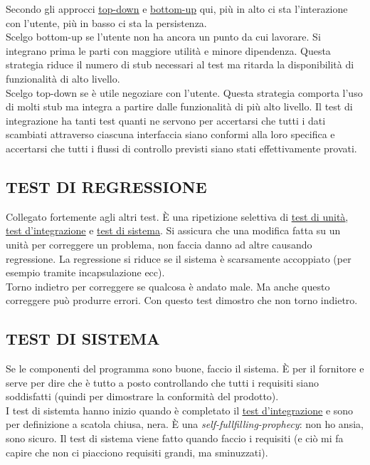 		Secondo gli approcci \underline{\hyperref[topdown]{top-down}} e \underline{\hyperref[bottomup]{bottom-up}} qui, più in alto ci sta l'interazione con l'utente, più in basso ci sta la persistenza. \\
		Scelgo bottom-up se l'utente non ha ancora un punto da cui lavorare. Si integrano prima le parti con maggiore utilità e minore dipendenza. Questa strategia riduce il numero di stub necessari al test ma ritarda la disponibilità di funzionalità di alto livello. \\
		Scelgo top-down se è utile negoziare con l'utente. Questa strategia comporta l’uso di molti stub ma integra a partire dalle funzionalità di più alto livello. %
		Il test di integrazione ha tanti test quanti ne servono per accertarsi che tutti i dati scambiati attraverso ciascuna interfaccia siano conformi alla loro specifica e accertarsi che tutti i flussi di controllo previsti siano stati effettivamente provati.
	
		
		\subsection{TEST DI REGRESSIONE}		\label{testregressione}
		Collegato fortemente agli altri test. È una ripetizione selettiva di \underline{\hyperref[testunita]{test di unità}}, \underline{\hyperref[testintegrazione]{test d'integrazione}} e \underline{\hyperref[testsistema]{test di sistema}}. Si assicura che una modifica fatta su un unità per correggere un problema, non faccia danno ad altre causando regressione. La regressione si riduce se il sistema è scarsamente accoppiato (per esempio tramite incapsulazione ecc). \\
		Torno indietro per correggere se qualcosa è andato male. Ma anche questo correggere può produrre errori. Con questo test dimostro che non torno indietro.
		
		
		\subsection{TEST DI SISTEMA}		\label{testsistema}
		Se le componenti del programma sono buone, faccio il sistema. È per il fornitore e serve per dire che è tutto a posto controllando che tutti i requisiti siano soddisfatti (quindi per dimostrare la conformità del prodotto).	\\
		I test di sistemta hanno inizio quando è completato il \underline{\hyperref[testintegrazione]{test d'integrazione}} e sono per definizione a scatola chiusa, nera. È una \textit{self-fullfilling-prophecy}: non ho ansia, sono sicuro. Il test di sistema viene fatto quando faccio i requisiti (e ciò mi fa capire che non ci piacciono requisiti grandi, ma sminuzzati).
	
